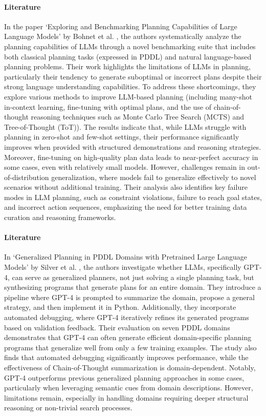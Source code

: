 \paragraph{Literature}
In the paper `Exploring and Benchmarking Planning Capabilities of Large Language
Models' by Bohnet et al. \cite{bohnet2024exploringbenchmarkingplanningcapabilities},
the authors systematically analyze the planning capabilities of LLMs through a
novel benchmarking suite that includes both classical planning tasks (expressed in
PDDL) and natural language-based planning problems. Their work highlights the limitations
of LLMs in planning, particularly their tendency to generate suboptimal or
incorrect plans despite their strong language understanding capabilities. To address
these shortcomings, they explore various methods to improve LLM-based planning (including
many-shot in-context learning, fine-tuning with optimal plans, and the use of chain-of-thought
reasoning techniques such as Monte Carlo Tree Search (MCTS) and Tree-of-Thought (ToT)).
The results indicate that, while LLMs struggle with planning in zero-shot and
few-shot settings, their performance significantly improves when provided with structured
demonstrations and reasoning strategies. Moreover, fine-tuning on high-quality plan
data leads to near-perfect accuracy in some cases, even with relatively small
models. However, challenges remain in out-of-distribution generalization, where models
fail to generalize effectively to novel scenarios without additional training.
Their analysis also identifies key failure modes in LLM planning, such as constraint
violations, failure to reach goal states, and incorrect action sequences,
emphasizing the need for better training data curation and reasoning frameworks.

\paragraph{Literature}
In `Generalized Planning in PDDL Domains with Pretrained Large Language Models' by
Silver et al. \cite{silver2023generalizedplanningpddldomains}, the authors investigate
whether LLMs, specifically GPT-4, can serve as generalized planners, not just
solving a single planning task, but synthesizing programs that generate plans for
an entire domain. They introduce a pipeline where GPT-4 is prompted to summarize
the domain, propose a general strategy, and then implement it in Python. Additionally,
they incorporate automated debugging, where GPT-4 iteratively refines its generated
programs based on validation feedback. Their evaluation on seven PDDL domains
demonstrates that GPT-4 can often generate efficient domain-specific planning
programs that generalize well from only a few training examples. The study also finds
that automated debugging significantly improves performance, while the
effectiveness of Chain-of-Thought summarization is domain-dependent. Notably,
GPT-4 outperforms previous generalized planning approaches in some cases, particularly
when leveraging semantic cues from domain descriptions. However, limitations remain,
especially in handling domains requiring deeper structural reasoning or non-trivial
search processes.